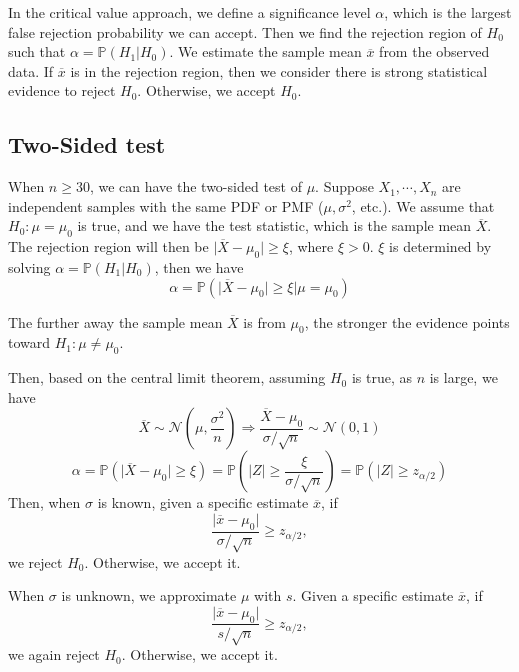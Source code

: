 In the critical value approach, we define a significance level \(\alpha\), which is the largest false rejection probability we can accept. Then we find the rejection region of \(H_0\) such that \(\alpha = \mathbb{P}(H_1 \vert H_0)\). We estimate the sample mean \(\overline{x}\) from the observed data. If \(\overline{x}\) is in the rejection region, then we consider there is strong statistical evidence to reject \(H_0\). Otherwise, we accept \(H_0\).

\subsection{Two-Sided test}
When \(n \geq 30\), we can have the two-sided test of \(\mu\). Suppose \(X_1, \cdots, X_n\) are independent samples with the same PDF or PMF (\(\mu, \sigma^2\), etc.). We assume that \(H_0: \mu = \mu_0\) is true, and we have the test statistic, which is the sample mean \(\overline{X}\). The rejection region will then be \(\vert \overline{X} - \mu_0 \vert \geq \xi\), where \(\xi > 0\). \(\xi\) is determined by solving \(\alpha = \mathbb{P}(H_1 \vert H_0)\), then we have 
\[
  \alpha = \mathbb{P}(\vert \overline{X} - \mu_0 \vert \geq \xi \vert \mu = \mu_0)
\]

\begin{remark}
  The further away the sample mean \(\overline{X}\) is from \(\mu_0\), the stronger the evidence points toward \(H_1: \mu \neq \mu_0\).
\end{remark}

Then, based on the central limit theorem, assuming \(H_0\) is true, as \(n\) is large, we have
\[
  \overline{X} \sim \mathcal{N} \left(\mu, \frac{\sigma^2}{n}\right) \Longrightarrow \frac{\overline{X} - \mu_0}{\sigma / \sqrt{n}} \sim \mathcal{N} (0, 1)
\]
\[
  \alpha = \mathbb{P} \left( \vert \overline{X} - \mu_0 \vert \geq \xi \right) = \mathbb{P} \left( \vert Z \vert \geq \frac{\xi}{\sigma / \sqrt{n}} \right) = \mathbb{P} \left( \vert Z \vert \geq z_{\alpha / 2} \right)
\]
Then, when \(\sigma\) is known, given a specific estimate \(\overline{x}\), if 
\[
  \frac{\vert \overline{x} - \mu_0 \vert}{\sigma / \sqrt{n}} \geq z_{\alpha / 2}, 
\]
we reject \(H_0\). Otherwise, we accept it.

When \(\sigma\) is unknown, we approximate \(\mu\) with \(s\). Given a specific estimate \(\overline{x}\), if 
\[
  \frac{\vert \overline{x} - \mu_0 \vert}{s / \sqrt{n}} \geq z_{\alpha / 2},
\]
we again reject \(H_0\). Otherwise, we accept it.

